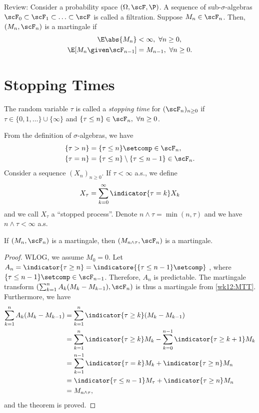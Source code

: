 \documentclass[../aipt.tex]{subfiles}
\begin{document}

Review: Consider a probability space $(\Omega, \scF, \P)$. A sequence of sub-$\sigma$-algebras $\scF_0 \subset \scF_1 \subset \ldots \subset \scF$ is called a filtration. Suppose $M_n \in \scF_n$. Then, $(M_n, \scF_n)$ is a martingale if 
\begin{align*}
\E \abs{M_n} &< \infty,\ \forall n \geq 0, \\
\E[M_n \given \scF_{n-1}] &= M_{n-1},\ \forall n \geq 0. 
\end{align*}

\section{Stopping Times}

\begin{Definition}
The random variable $\tau$ is called a \emph{stopping time} for $(\scF_n)_{n\geq0}$ if $\tau \in \{0,1,\ldots\} \cup \{\infty\}$ and $\{\tau \leq n\} \in \scF_n,\ \forall n \geq 0$.
\end{Definition}

From the definition of $\sigma$-algebras, we have
\begin{align*}
\{\tau > n\} &= \{\tau \leq n\}\setcomp \in \scF_n, \\
\{\tau = n\} &= \{\tau \leq n\} \setminus \{\tau \leq n-1\} \in \scF_n.
\end{align*}
Consider a sequence $(X_n)_{n \geq 0}$. If $\tau < \infty$ a.s., we define 
\begin{align*}
X_\tau = \sum_{k=0}^\infty \indicator{\tau=k}X_k
\end{align*}
and we call $X_\tau$ a ``stopped process''.  Denote $n \wedge \tau = \min(n, \tau)$ and we have $n \wedge \tau < \infty$ a.s. 

\begin{Theorem} \label{wk13:Thm:StoppingProcess}
If $(M_n, \scF_n)$ is a martingale, then $(M_{n \wedge \tau}, \scF_n)$ is a martingale.
\end{Theorem}
\begin{proof}
WLOG, we assume $M_0 = 0$. Let $A_n = \indicator{\tau \geq n} = \indicatore{\{\tau \leq n-1\}\setcomp}$ , where $\{\tau \leq n-1\}\setcomp \in \scF_{n-1}$. Therefore, $A_n$ is predictable. The martingale transform $\left(\sum_{k=1}^n A_k (M_k - M_{k-1}), \scF_n\right)$ is thus a martingale from \cref{wk12:MTT}. Furthermore, we have
\begin{align*}
\sum_{k=1}^n A_k (M_k - M_{k-1})
&= \sum_{k=1}^n \indicator{\tau \geq k} (M_k - M_{k-1}) \\
&= \sum_{k=1}^n \indicator{\tau \geq k} M_k - \sum_{k=0}^{n-1} \indicator{\tau \geq k+1} M_k \\
&= \sum_{k=1}^{n-1} \indicator{\tau = k} M_k + \indicator{\tau \geq n} M_n \\
&= \indicator{\tau \leq n-1} M_\tau + \indicator{\tau \geq n} M_n \\
&= M_{n \wedge \tau},
\end{align*}
and the theorem is proved.
\end{proof}
\end{document}
